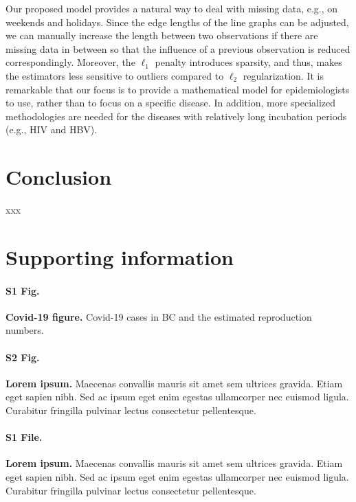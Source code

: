 \documentclass[10pt,letterpaper]{article}
\begin{document}
Our proposed model provides a natural way to deal with missing data, e.g., on weekends and holidays. Since the edge lengths of the line graphs can be adjusted, we can manually increase the length between two observations if there are missing data in between so that the influence of a previous observation is reduced correspondingly. Moreover, the $\ell_1$ penalty introduces sparsity, and thus, makes the estimators less sensitive to outliers compared to $\ell_2$ regularization. 
It is remarkable that our focus is to provide a mathematical model for epidemiologists to use, rather than to focus on a specific disease. In addition, more specialized methodologies are needed for the diseases with relatively long incubation periods (e.g., HIV and HBV). 


\section*{Conclusion}

xxx


\section*{Supporting information}

\paragraph*{S1 Fig.}
\label{S1_Fig}
{\bf Covid-19 figure.} Covid-19 cases in BC and the estimated reproduction numbers.

\paragraph*{S2 Fig.}
\label{S2_Fig}
{\bf Lorem ipsum.} Maecenas convallis mauris sit amet sem ultrices gravida. Etiam eget sapien nibh. Sed ac ipsum eget enim egestas ullamcorper nec euismod ligula. Curabitur fringilla pulvinar lectus consectetur pellentesque.

\paragraph*{S1 File.}
\label{S1_File}
{\bf Lorem ipsum.}  Maecenas convallis mauris sit amet sem ultrices gravida. Etiam eget sapien nibh. Sed ac ipsum eget enim egestas ullamcorper nec euismod ligula. Curabitur fringilla pulvinar lectus consectetur pellentesque.
\end{document}
